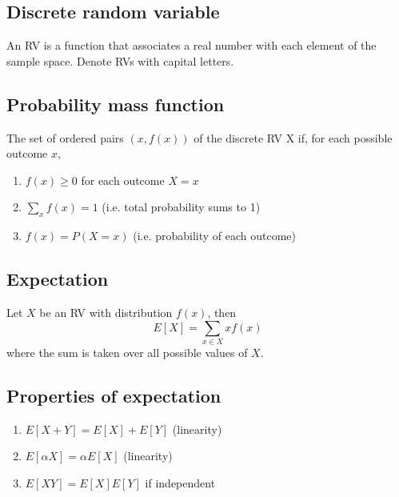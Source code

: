 \subsection{Discrete random variable}
    \begin{definition}
        An RV is a function that associates a real number with each element of the sample space. Denote RVs with capital letters.    
    \end{definition}

\subsection{Probability mass function}
    \begin{definition}
        The set of ordered pairs $(x,f(x))$ of the discrete RV X if, for each possible outcome $x$, 
        \begin{enumerate}
            \item $f(x) \geq 0$ for each outcome $X=x$ 
            \item $\sum_{x} f(x) = 1$ (i.e. total probability sums to 1)
            \item $f(x) = P(X=x)$ (i.e. probability of each outcome)
        \end{enumerate}
    \end{definition}
    
\subsection{Expectation}
    \begin{definition}
        Let $X$ be an RV with distribution $f(x)$, then 
        \begin{equation}
            E[X] = \sum_{x\in X} xf(x)
        \end{equation}
        where the sum is taken over all possible values of $X$.
    \end{definition}

\subsection{Properties of expectation}
    \begin{definition}
        
        \begin{enumerate}
            \item $E[X+Y] = E[X] + E[Y]$ (linearity)
            \item $E[\alpha X] = \alpha E[X]$ (linearity)
            \item $E[XY] = E[X]E[Y]$ if independent
        \end{enumerate}
    \end{definition}